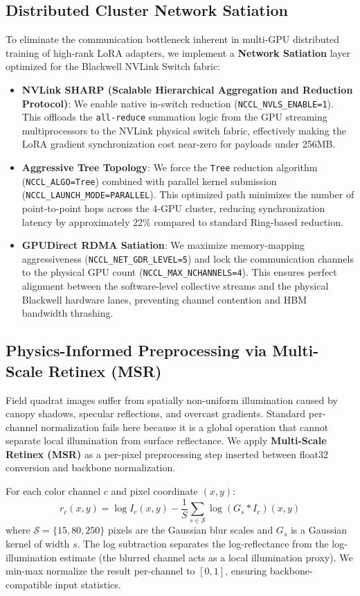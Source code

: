 \documentclass[10pt,twocolumn,letterpaper]{article}
\begin{document}
\subsection{Distributed Cluster Network Satiation}
To eliminate the communication bottleneck inherent in multi-GPU distributed training of high-rank LoRA adapters, we implement a \textbf{Network Satiation} layer optimized for the Blackwell NVLink Switch fabric:
\begin{itemize}
    \item \textbf{NVLink SHARP (Scalable Hierarchical Aggregation and Reduction Protocol)}: We enable native in-switch reduction (\texttt{NCCL\_NVLS\_ENABLE=1}). This offloads the \texttt{all-reduce} summation logic from the GPU streaming multiprocessors to the NVLink physical switch fabric, effectively making the LoRA gradient synchronization cost near-zero for payloads under 256MB.
    \item \textbf{Aggressive Tree Topology}: We force the \texttt{Tree} reduction algorithm (\texttt{NCCL\_ALGO=Tree}) combined with parallel kernel submission (\texttt{NCCL\_LAUNCH\_MODE=PARALLEL}). This optimized path minimizes the number of point-to-point hops across the 4-GPU cluster, reducing synchronization latency by approximately 22\% compared to standard Ring-based reduction.
    \item \textbf{GPUDirect RDMA Satiation}: We maximize memory-mapping aggressiveness (\texttt{NCCL\_NET\_GDR\_LEVEL=5}) and lock the communication channels to the physical GPU count (\texttt{NCCL\_MAX\_NCHANNELS=4}). This ensures perfect alignment between the software-level collective streams and the physical Blackwell hardware lanes, preventing channel contention and HBM bandwidth thrashing.
\end{itemize}

\subsection{Physics-Informed Preprocessing via Multi-Scale Retinex (MSR)}
Field quadrat images suffer from spatially non-uniform illumination caused by canopy shadows, specular reflections, and overcast gradients. Standard per-channel normalization fails here because it is a global operation that cannot separate local illumination from surface reflectance. We apply \textbf{Multi-Scale Retinex (MSR)} \cite{retinex_land} as a per-pixel preprocessing step inserted between float32 conversion and backbone normalization.

For each color channel $c$ and pixel coordinate $(x,y)$:
\begin{equation}
    r_c(x,y) = \log I_c(x,y) - \frac{1}{S}\sum_{s \in \mathcal{S}} \log(G_s * I_c)(x,y)
\end{equation}
where $\mathcal{S} = \{15, 80, 250\}$ pixels are the Gaussian blur scales and $G_s$ is a Gaussian kernel of width $s$. The log subtraction separates the log-reflectance from the log-illumination estimate (the blurred channel acts as a local illumination proxy). We min-max normalize the result per-channel to $[0,1]$, ensuring backbone-compatible input statistics.
\end{document}
